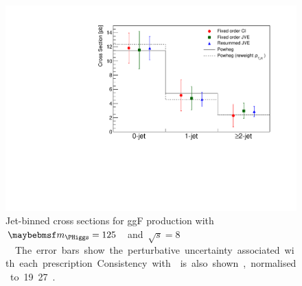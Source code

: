 \begin{figure}[t]
	\includegraphics[width=\largefigwidth]{custom_images/ggF_xs_jetbin}
	\caption{Jet-binned cross sections for ggF production with \unit{$\mH = 125$}{\GeV} and 
	\unit{$\sqrt{s} = 8$}{\TeV}. The error bars show the perturbative uncertainty 
	associated with each prescription. Consistency with  is also shown, normalised to \unit{19.27}{\pico\barn}.}
	\label{fig:signal:jetbin_xs_summary}
\end{figure}
